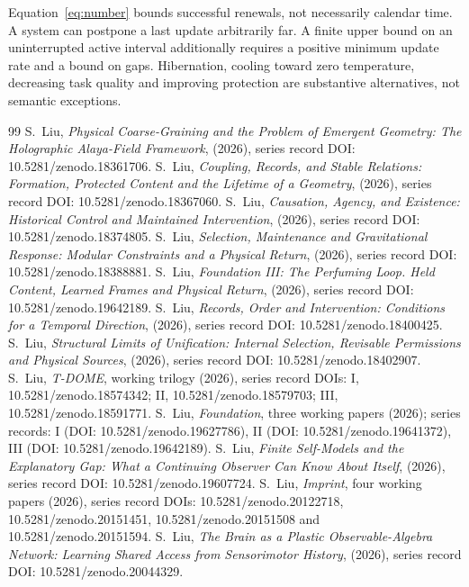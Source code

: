 \documentclass[12pt,a4paper]{article}
\begin{document}
Equation~\eqref{eq:number} bounds successful renewals, not necessarily calendar time. A system can postpone a last update arbitrarily far. A finite upper bound on an uninterrupted active interval additionally requires a positive minimum update rate and a bound on gaps. Hibernation, cooling toward zero temperature, decreasing task quality and improving protection are substantive alternatives, not semantic exceptions.

\begin{thebibliography}{99}
\small
{}
S.~Liu, \emph{Physical Coarse-Graining and the Problem of Emergent Geometry: The Holographic Alaya-Field Framework}, (2026), series record DOI: 10.5281/zenodo.18361706.
S.~Liu, \emph{Coupling, Records, and Stable Relations: Formation, Protected Content and the Lifetime of a Geometry}, (2026), series record DOI: 10.5281/zenodo.18367060.
S.~Liu, \emph{Causation, Agency, and Existence: Historical Control and Maintained Intervention}, (2026), series record DOI: 10.5281/zenodo.18374805.
S.~Liu, \emph{Selection, Maintenance and Gravitational Response: Modular Constraints and a Physical Return}, (2026), series record DOI: 10.5281/zenodo.18388881.
S.~Liu, \emph{Foundation III: The Perfuming Loop. Held Content, Learned Frames and Physical Return}, (2026), series record DOI: 10.5281/zenodo.19642189.
S.~Liu, \emph{Records, Order and Intervention: Conditions for a Temporal Direction}, (2026), series record DOI: 10.5281/zenodo.18400425.
S.~Liu, \emph{Structural Limits of Unification: Internal Selection, Revisable Permissions and Physical Sources}, (2026), series record DOI: 10.5281/zenodo.18402907.
S.~Liu, \emph{T-DOME}, working trilogy (2026), series record DOIs: I, 10.5281/zenodo.18574342; II, 10.5281/zenodo.18579703; III, 10.5281/zenodo.18591771.
S.~Liu, \emph{Foundation}, three working papers (2026); series records: I (DOI: 10.5281/zenodo.19627786), II (DOI: 10.5281/zenodo.19641372), III (DOI: 10.5281/zenodo.19642189).
S.~Liu, \emph{Finite Self-Models and the Explanatory Gap: What a Continuing Observer Can Know About Itself}, (2026), series record DOI: 10.5281/zenodo.19607724.
S.~Liu, \emph{Imprint}, four working papers (2026), series record DOIs: 10.5281/zenodo.20122718, 10.5281/zenodo.20151451, 10.5281/zenodo.20151508 and 10.5281/zenodo.20151594.
S.~Liu, \emph{The Brain as a Plastic Observable-Algebra Network: Learning Shared Access from Sensorimotor History}, (2026), series record DOI: 10.5281/zenodo.20044329.

\end{thebibliography}
\end{document}
